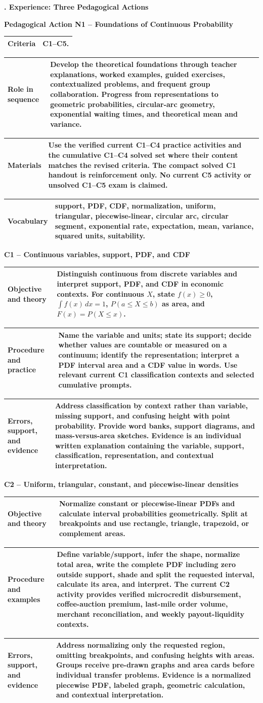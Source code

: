 \documentclass[10pt,letterpaper]{article}
\newcommand{\sectionbar}[1]{%
	\begin{tcolorbox}[
		enhanced,
		colback=sectionblue,
		colframe=sectionblue,
		boxrule=0pt,
		sharp corners,
		left=0.32in,
		right=0.08in,
		top=3.5pt,
		bottom=3.5pt,
		before skip=0pt,
		after skip=0pt,
		borderline north={1.15pt}{0pt}{black},
		borderline south={1.15pt}{0pt}{black}
		]
		\color{white}\bfseries\fontsize{12}{14}\selectfont #1
	\end{tcolorbox}%
}
\newcommand{\plansection}[1]{%
	\Needspace{8\baselineskip}\par\vspace{0.23in}\sectionbar{#1}\vspace{0.20in}%
}
\newcommand{\plansubsection}[1]{%
	\Needspace{7\baselineskip}\par\vspace{6pt}%
	\begin{tcolorbox}[
		colback=sectionblue!13,
		colframe=borderblue,
		boxrule=1.15pt,
		sharp corners,
		left=6pt,right=6pt,top=4pt,bottom=4pt,
		before skip=0pt,after skip=0pt]
		\bfseries #1
	\end{tcolorbox}%
}
\newcommand{\criterionpart}[1]{%
	\Needspace{10\baselineskip}\par\vspace{5pt}%
	\begin{tcolorbox}[
		colback=sectionblue!7,
		colframe=borderblue,
		boxrule=0.8pt,
		sharp corners,
		left=6pt,right=6pt,top=3pt,bottom=3pt,
		before skip=0pt,after skip=2pt]
		\bfseries #1
	\end{tcolorbox}%
}
\newcommand{\labelled}[2]{%
	\noindent
	\begin{tabularx}{\textwidth}{|>{\RaggedRight\arraybackslash\bfseries}p{2.12in}|>{\RaggedRight\arraybackslash}X|}
		\hline
		#1 & #2\\
		\hline
	\end{tabularx}\par\vspace{-\arrayrulewidth}%
}
\begin{document}
\plansection{5. Experience: Three Pedagogical Actions}

\plansubsection{Pedagogical Action N1 -- Foundations of Continuous Probability}
\labelled{Criteria}{C1--C5.}
\labelled{Role in sequence}{Develop the theoretical foundations through teacher explanations, worked examples, guided exercises, contextualized problems, and frequent group collaboration. Progress from representations to geometric probabilities, circular-arc geometry, exponential waiting times, and theoretical mean and variance.}
\labelled{Materials}{Use the verified current C1--C4 practice activities and the cumulative C1--C4 solved set where their content matches the revised criteria. The compact solved C1 handout is reinforcement only. No current C5 activity or unsolved C1--C5 exam is claimed.}
\labelled{Vocabulary}{support, PDF, CDF, normalization, uniform, triangular, piecewise-linear, circular arc, circular segment, exponential rate, expectation, mean, variance, squared units, suitability.}

\criterionpart{C1 -- Continuous variables, support, PDF, and CDF}
\labelled{Objective and theory}{Distinguish continuous from discrete variables and interpret support, PDF, and CDF in economic contexts. For continuous $X$, state $f(x)\ge0$, $\int f(x)\,dx=1$, $P(a\le X\le b)$ as area, and $F(x)=P(X\le x)$.}
\labelled{Procedure and practice}{Name the variable and units; state its support; decide whether values are countable or measured on a continuum; identify the representation; interpret a PDF interval area and a CDF value in words. Use relevant current C1 classification contexts and selected cumulative prompts.}
\labelled{Errors, support, and evidence}{Address classification by context rather than variable, missing support, and confusing height with point probability. Provide word banks, support diagrams, and mass-versus-area sketches. Evidence is an individual written explanation containing the variable, support, classification, representation, and contextual interpretation.}

\criterionpart{C2 -- Uniform, triangular, constant, and piecewise-linear densities}
\labelled{Objective and theory}{Normalize constant or piecewise-linear PDFs and calculate interval probabilities geometrically. Split at breakpoints and use rectangle, triangle, trapezoid, or complement areas.}
\labelled{Procedure and examples}{Define variable/support, infer the shape, normalize total area, write the complete PDF including zero outside support, shade and split the requested interval, calculate its area, and interpret. The current C2 activity provides verified microcredit disbursement, coffee-auction premium, last-mile order volume, merchant reconciliation, and weekly payout-liquidity contexts.}
\labelled{Errors, support, and evidence}{Address normalizing only the requested region, omitting breakpoints, and confusing heights with areas. Groups receive pre-drawn graphs and area cards before individual transfer problems. Evidence is a normalized piecewise PDF, labeled graph, geometric calculation, and contextual interpretation.}
\end{document}
